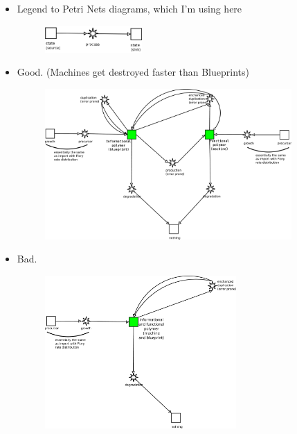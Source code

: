 \documentclass[12pt]{paper}
\begin{document}
\begin{itemize}
 \item Legend to Petri Nets diagrams, which I'm using here
\begin{figure}[h!]
 \centering
\includegraphics[width=0.35\textwidth]{pictures/legend.png}
\end{figure}
\item Good. (Machines get destroyed faster than Blueprints)
\begin{figure}[h!]
 \centering
\includegraphics[width=0.89\textwidth]{pictures/blueprint-machine.pdf}
\end{figure}

\item Bad. 
\begin{figure}[h!]
 \centering
\includegraphics[width=0.69\textwidth]{pictures/selfreplicating-machine.pdf}
\end{figure}
\end{itemize}
\end{document}
